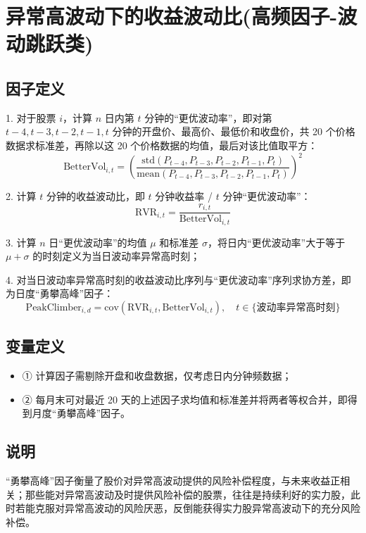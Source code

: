 \documentclass{article}
\begin{document}
\section{异常高波动下的收益波动比(高频因子-波动跳跃类)}

\subsection{因子定义}

1. 对于股票 \( i \)，计算 \( n \) 日内第 \( t \) 分钟的“更优波动率”，即对第 \( t-4, t-3, t-2, t-1, t \) 分钟的开盘价、最高价、最低价和收盘价，共 20 个价格数据求标准差，再除以这 20 个价格数据的均值，最后对该比值取平方：
\begin{equation}
    \mathrm{BetterVol}_{i,t} = \left( \frac{\mathrm{std}(P_{t-4}, P_{t-3}, P_{t-2}, P_{t-1}, P_t)}{\mathrm{mean}(P_{t-4}, P_{t-3}, P_{t-2}, P_{t-1}, P_t)} \right)^2
\end{equation}

2. 计算 \( t \) 分钟的收益波动比，即 \( t \) 分钟收益率 / \( t \) 分钟“更优波动率”：
\begin{equation}
    \mathrm{RVR}_{i,t} = \frac{r_{i,t}}{\mathrm{BetterVol}_{i,t}}
\end{equation}

3. 计算 \( n \) 日“更优波动率”的均值 \( \mu \) 和标准差 \( \sigma \)，将日内“更优波动率”大于等于 \( \mu + \sigma \) 的时刻定义为当日波动率异常高时刻；

4. 对当日波动率异常高时刻的收益波动比序列与“更优波动率”序列求协方差，即为日度“勇攀高峰”因子：
\begin{equation}
    \mathrm{PeakClimber}_{i,d} = \mathrm{cov}(\mathrm{RVR}_{i,t}, \mathrm{BetterVol}_{i,t}), \quad t \in \{ \text{波动率异常高时刻} \}
\end{equation}

\subsection{变量定义}
\begin{itemize}
    \item ① 计算因子需剔除开盘和收盘数据，仅考虑日内分钟频数据；
    \item ② 每月末可对最近 20 天的上述因子求均值和标准差并将两者等权合并，即得到月度“勇攀高峰”因子。
\end{itemize}

\subsection{说明}
“勇攀高峰”因子衡量了股价对异常高波动提供的风险补偿程度，与未来收益正相关；那些能对异常高波动及时提供风险补偿的股票，往往是持续利好的实力股，此时若能克服对异常高波动的风险厌恶，反倒能获得实力股异常高波动下的充分风险补偿。
\end{document}
